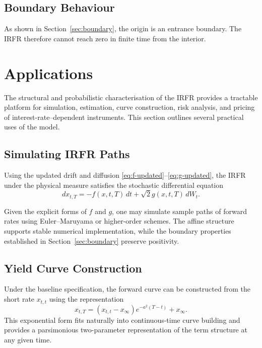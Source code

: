 \documentclass[12pt]{article}
\theoremstyle{statementstyle}
\begin{document}
\subsection{Boundary Behaviour}
\label{subsec:econ-boundary}

As shown in Section~\ref{sec:boundary}, the origin is an entrance
boundary. The IRFR therefore cannot reach zero in finite time from the
interior.
\section{Applications}
\label{sec:applications}

The structural and probabilistic characterisation of the IRFR provides
a tractable platform for simulation, estimation, curve construction,
risk analysis, and pricing of interest-rate--dependent instruments.
This section outlines several practical uses of the model.

\subsection{Simulating IRFR Paths}
\label{subsec:simulation}

Using the updated drift and diffusion 
\eqref{eq:f-updated}--\eqref{eq:g-updated}, the IRFR under the physical
measure satisfies the stochastic differential equation
\[
dx_{t,T}
=
-f(x,t,T)\,dt
+
\sqrt{2}g(x,t,T)\,dW_{t}.
\]

Given the explicit forms of $f$ and $g$, one may simulate sample paths
of forward rates using Euler--Maruyama or higher-order schemes. The
affine structure supports stable numerical implementation, while the
boundary properties established in Section~\ref{sec:boundary} preserve
positivity.

\subsection{Yield Curve Construction}
\label{subsec:yield-curve}

Under the baseline specification, the forward curve can be constructed from
the short rate \(x_{t,t}\) using the representation
\[
x_{t,T}
=
(x_{t,t} - x_{\infty})e^{-a^{2}(T-t)}
+
x_{\infty}.
\]
This exponential form fits naturally into continuous-time curve building
and provides a parsimonious two-parameter representation of the term
structure at any given time.
\end{document}
